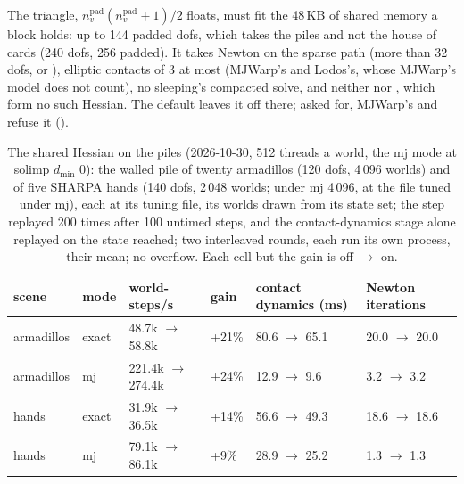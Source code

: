 The triangle, $n_v^{\mathrm{pad}}(n_v^{\mathrm{pad}}+1)/2$ floats, must fit the 48\,KB of shared memory a block holds: up to 144 padded dofs, which takes the piles and not the house of cards (240 dofs, 256 padded). It takes Newton on the sparse path (more than 32 dofs, or ), elliptic contacts of  3 at most (MJWarp's and Lodos's, whose  MJWarp's model does not count), no sleeping's compacted solve, and neither  nor , which form no such Hessian. The default leaves it off there; asked for, MJWarp's  and  refuse it ().

\begin{table}[t]
\centering
\caption{The shared Hessian on the piles (2026-10-30, 512 threads a world, the mj mode at solimp $d_{\min}$ 0): the walled pile of twenty armadillos (120 dofs, 4\,096 worlds) and of five SHARPA hands (140 dofs, 2\,048 worlds; under mj 4\,096, at the file tuned under mj), each at its tuning file, its worlds drawn from its state set; the step replayed 200 times after 100 untimed steps, and the contact-dynamics stage alone replayed on the state reached; two interleaved rounds, each run its own process, their mean; no overflow. Each cell but the gain is off $\to$ on.}
\label{tab:sharedhessian}
\small
\begin{tabularx}{\linewidth}{@{}L{20mm}L{10mm}YR{10mm}R{34mm}R{28mm}@{}}
\toprule
scene & mode & world-steps/s & gain & contact dynamics (ms) & Newton iterations \\
\midrule
armadillos & exact & 48.7k $\to$ 58.8k & +21\% & 80.6 $\to$ 65.1 & 20.0 $\to$ 20.0 \\
armadillos & mj & 221.4k $\to$ 274.4k & +24\% & 12.9 $\to$ 9.6 & 3.2 $\to$ 3.2 \\
hands & exact & 31.9k $\to$ 36.5k & +14\% & 56.6 $\to$ 49.3 & 18.6 $\to$ 18.6 \\
hands & mj & 79.1k $\to$ 86.1k & +9\% & 28.9 $\to$ 25.2 & 1.3 $\to$ 1.3 \\
\bottomrule
\end{tabularx}
\end{table}

